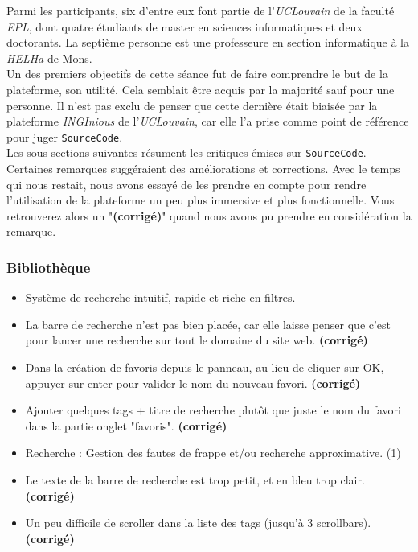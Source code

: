 Parmi les participants, six d'entre eux font partie de l'\textit{UCLouvain} de la faculté \textit{EPL}, dont quatre étudiants de master en sciences informatiques et deux doctorants. La septième personne est une professeure en section informatique à la \textit{HELHa} de Mons.\\

Un des premiers objectifs de cette séance fut de faire comprendre le but de la plateforme, son utilité. Cela semblait être acquis par la majorité sauf pour une personne. Il n'est pas exclu de penser que cette dernière était biaisée par la plateforme \textit{INGInious} de l'\textit{UCLouvain}, car elle l'a prise comme point de référence pour juger \texttt{SourceCode}.\\

Les sous-sections suivantes résument les critiques émises sur \texttt{SourceCode}. Certaines remarques suggéraient des améliorations et corrections. Avec le temps qui nous restait, nous avons essayé de les prendre en compte pour rendre l'utilisation de la plateforme un peu plus immersive et plus fonctionnelle. Vous retrouverez alors un "\textbf{(corrigé)}" quand nous avons pu prendre en considération la remarque.

\subsubsection*{Bibliothèque}

\begin{itemize}
    \item Système de recherche intuitif, rapide et riche en filtres.
    \item La barre de recherche n'est pas bien placée, car elle laisse penser que c'est pour lancer une recherche sur tout le domaine du site web. \textbf{(corrigé)}
    \item Dans la création de favoris depuis le panneau, au lieu de cliquer sur OK, appuyer sur enter pour valider le nom du nouveau favori. \textbf{(corrigé)}
    \item Ajouter quelques tags + titre de recherche plutôt que juste le nom du favori dans la partie onglet "favoris". \textbf{(corrigé)}
    \item Recherche : Gestion des fautes de frappe et/ou recherche approximative. (1)
    \item Le texte de la barre de recherche est trop petit, et en bleu trop clair. \textbf{(corrigé)}
    \item Un peu difficile de scroller dans la liste des tags (jusqu'à 3 scrollbars). \textbf{(corrigé)}
\end{itemize}
\bigskip

